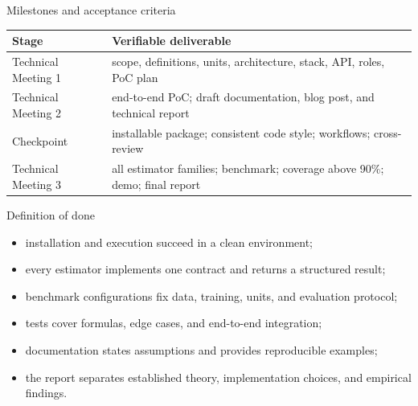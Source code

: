 \documentclass[aspectratio=169,notheorems]{beamer}
\begin{document}
\begin{frame}[shrink=4]{Milestones and acceptance criteria}
\small
\renewcommand{\arraystretch}{1.15}
\begin{tabular}{@{}L{0.21\textwidth}L{0.70\textwidth}@{}}
\toprule
\textbf{Stage} & \textbf{Verifiable deliverable} \\
\midrule
Technical Meeting 1 & scope, definitions, units, architecture, stack, API, roles, PoC plan \\
Technical Meeting 2 & end-to-end PoC; draft documentation, blog post, and technical report \\
Checkpoint & installable package; consistent code style; workflows; cross-review \\
Technical Meeting 3 & all estimator families; benchmark; coverage above 90\%; demo; final report \\
\bottomrule
\end{tabular}

\medskip
\begin{block}{Definition of done}
\begin{itemize}\setlength{\itemsep}{0.23em}
  \item installation and execution succeed in a clean environment;
  \item every estimator implements one contract and returns a structured result;
  \item benchmark configurations fix data, training, units, and evaluation protocol;
  \item tests cover formulas, edge cases, and end-to-end integration;
  \item documentation states assumptions and provides reproducible examples;
  \item the report separates established theory, implementation choices, and empirical findings.
\end{itemize}
\end{block}
\end{frame}
\end{document}

